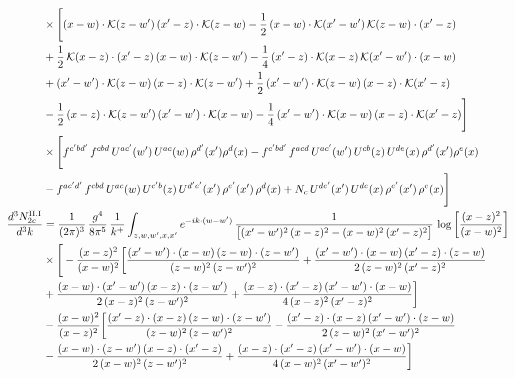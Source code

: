 \documentclass[9pt]{article}
\numberwithin{equation}{section}
\begin{document}
\begin{align}
&\times\Bigg[(x-w)\cdot\mathcal{K}(z-w^{\prime})\,(x^{\prime}-z)\cdot\mathcal{K}(z-w)-\frac{1}{2}\,(x-w)\cdot\mathcal{K}(x^{\prime}-w^{\prime})\,\mathcal{K}(z-w)\cdot(x^{\prime}-z)\notag \\ & +\frac{1}{2}\,\mathcal{K}(x-z)\cdot(x^{\prime}-z)\,(x-w)\cdot\mathcal{K}(z-w^{\prime}) -\frac{1}{4}\,(x^{\prime}-z)\cdot\mathcal{K}(x-z)\,\mathcal{K}(x^{\prime}-w^{\prime})\cdot(x-w)\notag \\ & +(x^{\prime}-w^{\prime})\cdot\mathcal{K}(z-w)\,(x-z)\cdot\mathcal{K}(z-w^{\prime})+\frac{1}{2}\,(x^{\prime}-w^{\prime})\cdot\mathcal{K}(z-w)\,(x-z)\cdot\mathcal{K}(x^{\prime}-z)\notag \\ & -\frac{1}{2}\,(x-z)\cdot\mathcal{K}(z-w^{\prime})\,(x^{\prime}-w^{\prime})\cdot\mathcal{K}(x-w)-\frac{1}{4}\,(x^{\prime}-w^{\prime})\cdot\mathcal{K}(x-w)\,(x-z)\cdot\mathcal{K}(x^{\prime}-z)\Bigg]\notag\\
&\times\Bigg[f^{c^{\prime}bd^{\prime}}\,f^{cbd}\, U^{ac^{\prime}}(w^{\prime})\,U^{ac}(w)\,\rho^{d^{\prime}}(x^{\prime})\rho^{d}(x)- f^{c^{\prime}bd^{\prime}}\,f^{acd}\,U^{ac^{\prime}}(w^{\prime})\,U^{cb}(z)\,U^{de}(x)\,\rho^{d^{\prime}}(x^{\prime})\rho^{e}(x) \notag \\ & -f^{ac^{\prime}d^{\prime}}\,f^{cbd}\,U^{ac}(w)\,U^{c^{\prime}b}(z)\,U^{d^{\prime}e^{\prime}}(x^{\prime})\,\rho^{e^{\prime}}(x^{\prime})\,\rho^{d}(x) +N_{c}\,U^{de^{\prime}}(x^{\prime})\,U^{de}(x)\,\rho^{e^{\prime}}(x^{\prime})\,\rho^{e}(x)\Bigg]\label{eq:B-II2b}\\
\frac{d^{3}N^{\rm II.I}_{2c}}{d^{3}k} &= \frac{1}{(2\pi)^{3}}\,\frac{g^{4}}{8\pi^{5}}\,\frac{1}{k^{+}}\int_{z,w,w^{\prime},x,x^{\prime}}e^{-ik\cdot(w-w^{\prime})}\,\frac{1}{\big[(x^{\prime}-w^{\prime})^{2}\,(x-z)^{2}-(x-w)^{2}\,(x^{\prime}-z)^{2}\big]}\,\log\left[\frac{(x-z)^{2}}{(x-w)^{2}}\right]\notag\\
&\times\Bigg[-\frac{(x-z)^{2}}{(x-w)^{2}}\bigg[\frac{(x^{\prime}-w^{\prime})\cdot(x-w)\,(z-w)\cdot(z-w^{\prime})}{(z-w)^{2}\,(z-w^{\prime})^{2}}+\frac{(x^{\prime}-w^{\prime})\cdot(x-w)\,(x^{\prime}-z)\cdot(z-w)}{2\,(z-w)^{2}\,(x^{\prime}-z)^{2}}\notag \\ & +\frac{(x-w)\cdot(x^{\prime}-w^{\prime})\,(x-z)\cdot(z-w^{\prime})}{2\,(x-z)^{2}\,(z-w^{\prime})^{2}}+\frac{(x-z)\cdot(x^{\prime}-z)\,(x^{\prime}-w^{\prime})\cdot(x-w)}{4\,(x-z)^{2}\,(x^{\prime}-z)^{2}}\bigg]\notag\\
&-\frac{(x-w)^{2}}{(x-z)^{2}}\bigg[\frac{(x^{\prime}-z)\cdot(x-z)\,(z-w)\cdot(z-w^{\prime})}{(z-w)^{2}\,(z-w^{\prime})^{2}}-\frac{(x^{\prime}-z)\cdot(x-z)\,(x^{\prime}-w^{\prime})\cdot(z-w)}{2\,(z-w)^{2}\,(x^{\prime}-w^{\prime})^{2}}\notag \\ & -\frac{(x-w)\cdot(z-w^{\prime})\,(x-z)\cdot(x^{\prime}-z)}{2\,(x-w)^{2}\,(z-w^{\prime})^{2}}+\frac{(x-z)\cdot(x^{\prime}-z)\,(x^{\prime}-w^{\prime})\cdot(x-w)}{4\,(x-w)^{2}\,(x^{\prime}-w^{\prime})^{2}}\bigg]\notag\\

\end{align}
\end{document}

